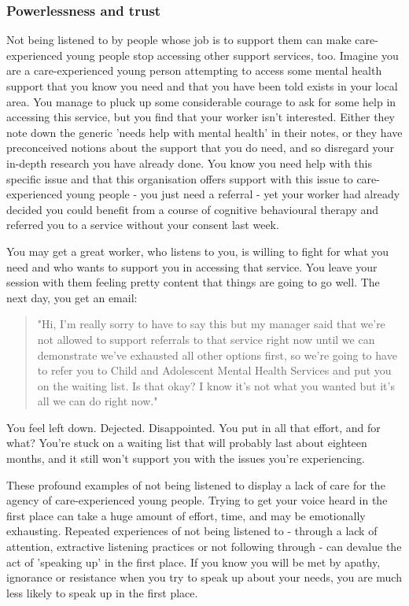 \subsubsection{Powerlessness and trust}
Not being listened to by people whose job is to support them can make care-experienced young people stop accessing other support services, too. Imagine you are a care-experienced young person attempting to access some mental health support that you know you need and that you have been told exists in your local area. You manage to pluck up some considerable courage to ask for some help in accessing this service, but you find that your worker isn't interested. Either they note down the generic 'needs help with mental health' in their notes, or they have preconceived notions about the support that you do need, and so disregard your in-depth research you have already done. You know you need help with this specific issue and that this organisation offers support with this issue to care-experienced young people - you just need a referral - yet your worker had already decided you could benefit from a course of cognitive behavioural therapy and referred you to a service without your consent last week.

You may get a great worker, who listens to you, is willing to fight for what you need and who wants to support you in accessing that service. You leave your session with them feeling pretty content that things are going to go well. The next day, you get an email:

\begin{quote}
"Hi, I'm really sorry to have to say this but my manager said that we’re not allowed to support referrals to that service right now until we can demonstrate we’ve exhausted all other options first, so we’re going to have to refer you to Child and Adolescent Mental Health Services and put you on the waiting list. Is that okay? I know it's not what you wanted but it's all we can do right now."
\end{quote}

You feel left down. Dejected. Disappointed. You put in all that effort, and for what? You’re stuck on a waiting list that will probably last about eighteen months, and it still won’t support you with the issues you’re experiencing. 

These profound examples of not being listened to display a lack of care for the agency of care-experienced young people. Trying to get your voice heard in the first place can take a huge amount of effort, time, and may be emotionally exhausting. Repeated experiences of not being listened to - through a lack of attention, extractive listening practices or not following through - can devalue the act of 'speaking up' in the first place. If you know you will be met by apathy, ignorance or resistance when you try to speak up about your needs, you are much less likely to speak up in the first place.


